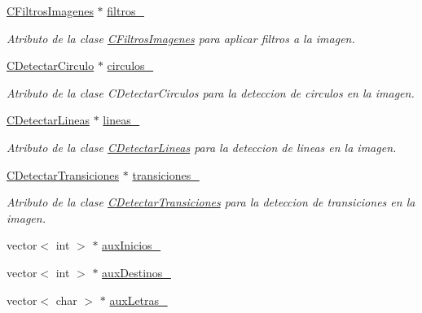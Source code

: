 \begin{DoxyCompactItemize}
\item 
\hyperlink{classCFiltrosImagenes}{C\+Filtros\+Imagenes} $\ast$ \hyperlink{classCOperacionesImagen_aa27657bee56e9afe2a64937e15c15d46}{filtros\+\_\+}
\begin{DoxyCompactList}\small\item\em Atributo de la clase \hyperlink{classCFiltrosImagenes}{C\+Filtros\+Imagenes} para aplicar filtros a la imagen. \end{DoxyCompactList}\item 
\hyperlink{classCDetectarCirculo}{C\+Detectar\+Circulo} $\ast$ \hyperlink{classCOperacionesImagen_a385572b456e0aeaa055392daecf325d6}{circulos\+\_\+}
\begin{DoxyCompactList}\small\item\em Atributo de la clase C\+Detectar\+Circulos para la deteccion de circulos en la imagen. \end{DoxyCompactList}\item 
\hyperlink{classCDetectarLineas}{C\+Detectar\+Lineas} $\ast$ \hyperlink{classCOperacionesImagen_a50efc40444cef260102dc2ceb6d4c608}{lineas\+\_\+}
\begin{DoxyCompactList}\small\item\em Atributo de la clase \hyperlink{classCDetectarLineas}{C\+Detectar\+Lineas} para la deteccion de lineas en la imagen. \end{DoxyCompactList}\item 
\hyperlink{classCDetectarTransiciones}{C\+Detectar\+Transiciones} $\ast$ \hyperlink{classCOperacionesImagen_a7ca38abb7714e00773895e8bcda443c1}{transiciones\+\_\+}
\begin{DoxyCompactList}\small\item\em Atributo de la clase \hyperlink{classCDetectarTransiciones}{C\+Detectar\+Transiciones} para la deteccion de transiciones en la imagen. \end{DoxyCompactList}\item 
vector$<$ int $>$ $\ast$ \hyperlink{classCOperacionesImagen_af0f1f09f1b470be97924d72b81e7e5de}{aux\+Inicios\+\_\+}
\item 
vector$<$ int $>$ $\ast$ \hyperlink{classCOperacionesImagen_a9eb01c694302f6bf936955d8cea9f61d}{aux\+Destinos\+\_\+}
\item 
vector$<$ char $>$ $\ast$ \hyperlink{classCOperacionesImagen_a984f9ea55b09b5e12564c6d29130394e}{aux\+Letras\+\_\+}
\end{DoxyCompactItemize}


